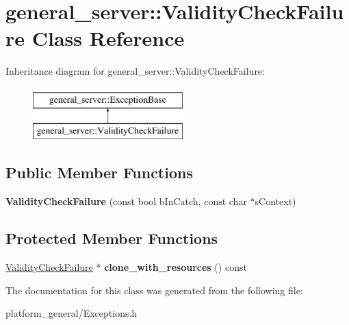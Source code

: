 \hypertarget{classgeneral__server_1_1ValidityCheckFailure}{\section{general\-\_\-server\-:\-:\-Validity\-Check\-Failure \-Class \-Reference}
\label{classgeneral__server_1_1ValidityCheckFailure}
}
\-Inheritance diagram for general\-\_\-server\-:\-:\-Validity\-Check\-Failure\-:\begin{figure}[H]
\begin{center}
\leavevmode
\includegraphics[height=2.000000cm]{classgeneral__server_1_1ValidityCheckFailure}
\end{center}
\end{figure}
\subsection*{\-Public \-Member \-Functions}
\begin{DoxyCompactItemize}
\item 
\hypertarget{classgeneral__server_1_1ValidityCheckFailure_ac16be18137bdb359361c3ff8d3d0dbb9}{{\bfseries \-Validity\-Check\-Failure} (const bool b\-In\-Catch, const char $\ast$s\-Context)}\label{classgeneral__server_1_1ValidityCheckFailure_ac16be18137bdb359361c3ff8d3d0dbb9}

\end{DoxyCompactItemize}
\subsection*{\-Protected \-Member \-Functions}
\begin{DoxyCompactItemize}
\item 
\hypertarget{classgeneral__server_1_1ValidityCheckFailure_a415d50d25c4a48bdade45316916a8f0b}{\hyperlink{classgeneral__server_1_1ValidityCheckFailure}{\-Validity\-Check\-Failure} $\ast$ {\bfseries clone\-\_\-with\-\_\-resources} () const }\label{classgeneral__server_1_1ValidityCheckFailure_a415d50d25c4a48bdade45316916a8f0b}

\end{DoxyCompactItemize}


\-The documentation for this class was generated from the following file\-:\begin{DoxyCompactItemize}
\item 
platform\-\_\-general/\-Exceptions.\-h\end{DoxyCompactItemize}
